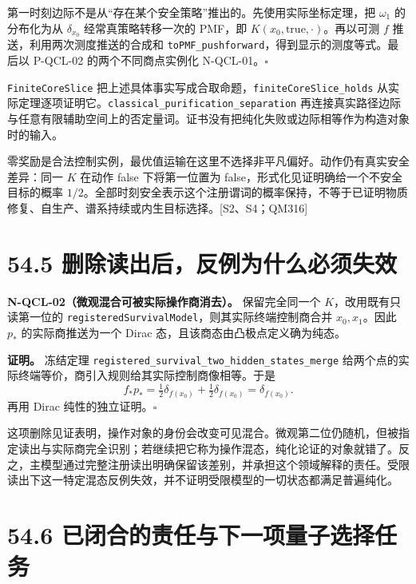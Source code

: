 \documentclass[
  11pt,
  oneside]{book}
\begin{document}
第一时刻边际不是从``存在某个安全策略''推出的。先使用实际坐标定理，把
\(\omega_1\) 的分布化为从 \(\delta_{x_0}\) 经常真策略转移一次的 PMF，即
\(K(x_0,\mathrm{true},\cdot)\)。再以可测 \(f\)
推送，利用两次测度推送的合成和
\texttt{to\allowbreak PMF\_\allowbreak pushforward}，得到显示的测度等式。最后以 P-QCL-02
的两个不同商点实例化 N-QCL-01。\(\square\)

\texttt{Finite\allowbreak Core\allowbreak Slice}
把上述具体事实写成合取命题，\texttt{finite\allowbreak Core\allowbreak Slice\_\allowbreak holds}
从实际定理逐项证明它。\texttt{classical\_\allowbreak purification\_\allowbreak separation}
再连接真实路径边际与任意有限辅助空间上的否定量词。证书没有把纯化失败或边际相等作为构造对象时的输入。

零奖励是合法控制实例，最优值运输在这里不选择非平凡偏好。动作仍有真实安全差异：同一
\(K\) 在动作 false 下将第一位置为
false，形式化见证明确给一个不安全目标的概率
\(1/2\)。全部时刻安全表示这个注册谓词的概率保持，不等于已证明物质修复、自生产、谱系持续或内生目标选择。{[}S2、S4；QM316{]}

\section{54.5 删除读出后，反例为什么必须失效}

\protect\hypertarget{n-qcl-02}{}{}

\textbf{N-QCL-02（微观混合可被实际操作商消去）。} 保留完全同一个
\(K\)，改用既有只读第一位的
\texttt{registered\allowbreak Survival\allowbreak Model}，则其实际终端控制商合并
\(x_0,x_1\)。因此 \(p_*\) 的实际商推送为一个 Dirac
态，且该商态由凸极点定义确为纯态。

\textbf{证明。} 冻结定理
\texttt{registered\_\allowbreak survival\_\allowbreak two\_\allowbreak hidden\_\allowbreak states\_\allowbreak merge}
给两个点的实际终端等价，商引入规则给其实际控制商像相等。于是 \[
f_*p_* = \tfrac12\delta_{f(x_0)}+\tfrac12\delta_{f(x_0)}
=\delta_{f(x_0)}.
\] 再用 Dirac 纯性的独立证明。\(\square\)

这项删除见证表明，操作对象的身份会改变可见混合。微观第二位仍随机，但被指定读出与实际商完全识别；若继续把它称为操作混态，纯化论证的对象就错了。反之，主模型通过完整注册读出明确保留该差别，并承担这个领域解释的责任。受限读出下这一特定混态反例失效，并不证明受限模型的一切状态都满足普遍纯化。

\section{54.6 已闭合的责任与下一项量子选择任务}
\end{document}
